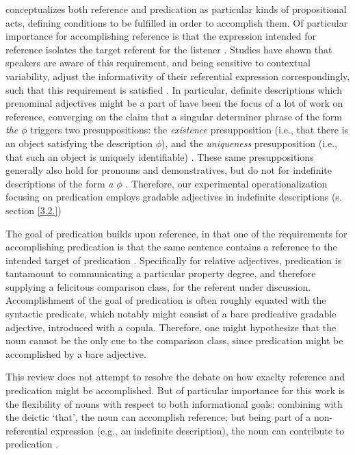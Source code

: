 \textcite{searle1969speech} conceptualizes both reference and predication as particular kinds of propositional acts, defining conditions to be fulfilled in order to accomplish them. Of particular importance for accomplishing reference is that the expression intended for reference isolates the target referent for the listener \parencite{searle1969speech}. Studies have shown that speakers are aware of this requirement, and being sensitive to contextual variability, adjust the informativity of their referential expression correspondingly, such that this requirement is satisfied \parencite[e.g.,][]{graf2016animal}. In particular, definite descriptions which prenominal adjectives might be a part of have been the focus of a lot of work on reference, converging on the claim that a singular determiner phrase of the form \emph{the $\phi$} triggers two presuppositions: the \textit{existence} presupposition (i.e., that there is an object satisfying the description $\phi$), and the \textit{uniqueness} presupposition (i.e., that such an object is uniquely identifiable) \parencite{syrett2010meaning, michaelson2019}. These same presuppositions generally also hold for pronouns and demonstratives, but do not for indefinite descriptions of the form \textit{a $\phi$} \parencite{braun2017, Reboul2001}. Therefore, our experimental operationalization focusing on predication employs gradable adjectives in indefinite descriptions (s. section \ref{3.2.})

The goal of predication builds upon reference, in that one of the requirements for accomplishing predication is that the same sentence contains a reference to the intended target of predication \parencite{searle1969speech, Reboul2001}. Specifically for relative adjectives, predication is tantamount to communicating a particular property degree, and therefore supplying a felicitous comparison class, for the referent under discussion. Accomplishment of the goal of predication is often roughly equated with the syntactic predicate, which notably might consist of a bare predicative gradable adjective, introduced with a copula. Therefore, one might hypothesize that the noun cannot be the only cue to the comparison class, since predication might be accomplished by a bare adjective.

This review does not attempt to resolve the debate on how exaclty reference and predication might be accomplished. But of particular importance for this work is the flexibility of nouns with respect to both informational goals: combining with the deictic ‘that’, the noun can accomplish reference; but being part of a non-referential expression (e.g., an indefinite description), the noun can contribute to predication \parencite{Reboul2001}. 

